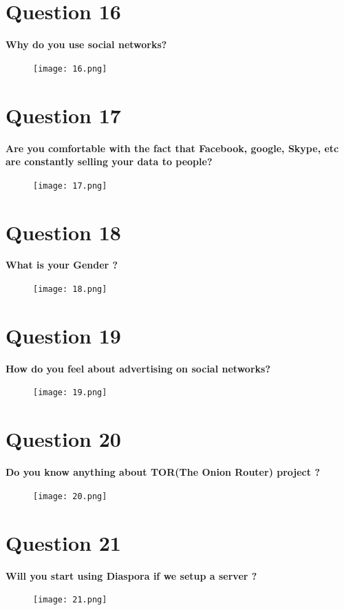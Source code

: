 \documentclass[11pt]{book}
\begin{document}
\newpage
\chapter{Question 16}
\textbf{Why do you use social networks?
}
\begin{figure}[ht!]
	\centering
	\texttt{[image: 16.png]}
	\label{overflow}
\end{figure}

\newpage
\chapter{Question 17}
\textbf{Are you comfortable with the fact that Facebook, google, Skype, etc are constantly selling your data to people?
}
\begin{figure}[ht!]
	\centering
	\texttt{[image: 17.png]}
	\label{overflow}
\end{figure}

\newpage
\chapter{Question 18}
\textbf{What is your Gender ?
}
\begin{figure}[ht!]
	\centering
	\texttt{[image: 18.png]}
	\label{overflow}
\end{figure}

\newpage
\chapter{Question 19}
\textbf{How do you feel about advertising on social networks?
}
\begin{figure}[ht!]
	\centering
	\texttt{[image: 19.png]}
	\label{overflow}
\end{figure}

\newpage
\chapter{Question 20}
\textbf{Do you know anything about TOR(The Onion Router) project ?
}
\begin{figure}[ht!]
	\centering
	\texttt{[image: 20.png]}
	\label{overflow}
\end{figure}

\newpage
\chapter{Question 21}
\textbf{Will you start using Diaspora if we setup a server ?}
\begin{figure}[ht!]
	\centering
	\texttt{[image: 21.png]}
	\label{overflow}
\end{figure}
\end{document}
